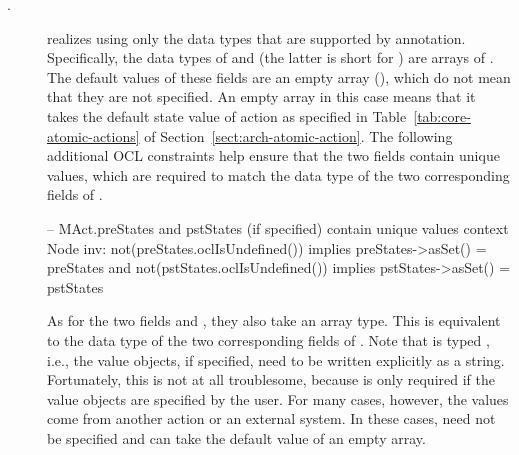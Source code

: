 \begin{description}
\item[.]  realizes  using only the data types that are supported by annotation. Specifically, the data types of  and  (the latter is short for ) are arrays of . The default values of these fields are an empty array (\code{[]}), which do not mean that they are not specified. An empty array in this case means that it takes the default state value of action as specified in Table~\ref{tab:core-atomic-actions} of Section~\ref{sect:arch-atomic-action}.
The following additional OCL constraints help ensure that the two fields contain unique values, which are required to match the  data type of the two corresponding fields of .
\begin{lstrule}
-- MAct.preStates and pstStates (if specified) contain unique values
context Node inv:
  not(preStates.oclIsUndefined()) implies preStates->asSet() = preStates and 
  not(pstStates.oclIsUndefined()) implies pstStates->asSet() = pstStates
\end{lstrule}

As for the two fields  and , they also take an array type. This is equivalent to the  data type of the two corresponding fields of . Note that  is typed , i.e., the value objects, if specified, need to be written explicitly as a string. Fortunately, this is not at all troublesome, because  is only required if the value objects are specified by the user. For many cases, however, the values come from another action or an external system. In these cases,  need not be specified and can take the default value of an empty array.


\end{description}
